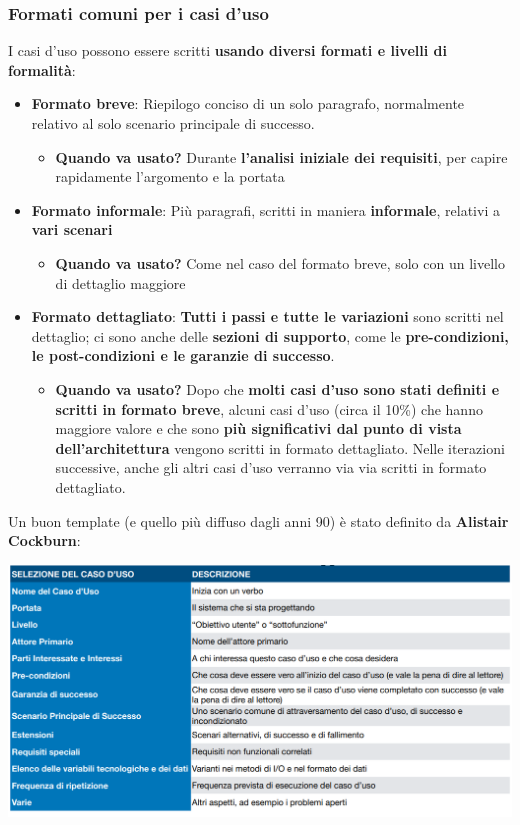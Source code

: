 \documentclass[12pt]{article}
\begin{document}
\subsubsection{Formati comuni per i casi d'uso}
I casi d'uso possono essere scritti \textbf{usando diversi formati e livelli di formalità}:
\begin{itemize}
    \item \textbf{Formato breve}: Riepilogo conciso di un solo paragrafo, normalmente relativo al solo scenario principale di successo.
    \begin{itemize}
        \item \textbf{Quando va usato?} Durante \textbf{l'analisi iniziale dei requisiti}, per capire rapidamente l'argomento e la portata
    \end{itemize}
    \item \textbf{Formato informale}: Più paragrafi, scritti in maniera \textbf{informale}, relativi a \textbf{vari scenari}
    \begin{itemize}
        \item \textbf{Quando va usato?} Come nel caso del formato breve, solo con un livello di dettaglio maggiore
    \end{itemize}
    \item \textbf{Formato dettagliato}: \textbf{Tutti i passi e tutte le variazioni} sono scritti nel dettaglio; ci sono anche delle \textbf{sezioni di supporto}, come le \textbf{pre-condizioni, le post-condizioni e le garanzie di successo}.
    \begin{itemize}
        \item \textbf{Quando va usato?} Dopo che \textbf{molti casi d'uso sono stati definiti e scritti in formato breve}, alcuni casi d'uso (circa il 10\%) che hanno maggiore valore e che sono \textbf{più significativi dal punto di vista dell'architettura} vengono scritti in formato dettagliato. Nelle iterazioni successive, anche gli altri casi d'uso verranno via via scritti in formato dettagliato.
    \end{itemize}
\end{itemize}
Un buon template (e quello più diffuso dagli anni 90) è stato definito da \textbf{Alistair Cockburn}:
\begin{center}
    \includegraphics[width = 1.05\textwidth]{Images/32.PNG}
\end{center}
\end{document}
